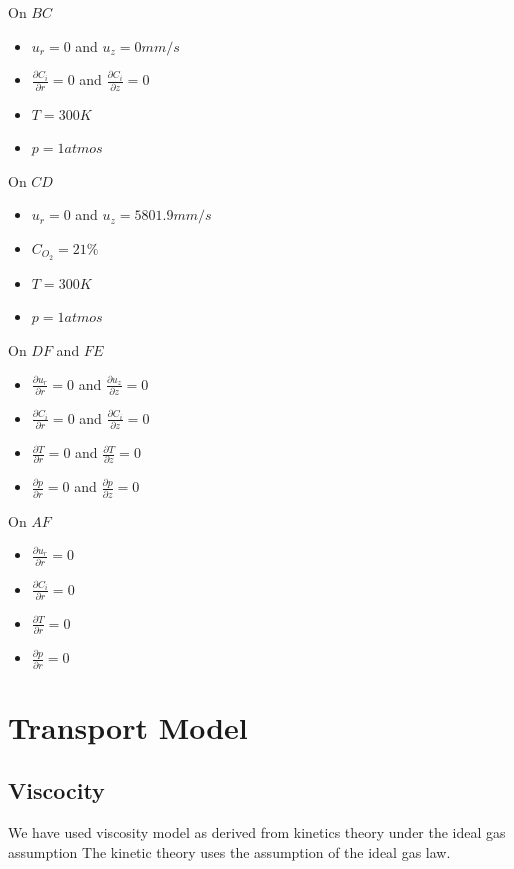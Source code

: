 \bigskip 
\noindent On $BC$
\begin{itemize}
\item $u_r = 0$ and $u_z=0 mm/s$
\item $\frac{\partial C_i}{\partial r} =0 $ and $\frac{\partial C_i}{\partial z} =0 $
\item $T = 300K$
\item $p=1 atmos$
\end{itemize}

\noindent On $CD$
\begin{itemize}
\item $u_r = 0$ and $u_z=5801.9 mm/s$
\item $ C_{O_2} =21 \% $
\item $T = 300K$
\item $p=1 atmos$
\end{itemize}

\noindent On $DF$ and $FE$
\begin{itemize}
\item $\frac{\partial u_r}{\partial r} =0 $ and $\frac{\partial u_z}{\partial z} =0 $
\item $\frac{\partial C_i}{\partial r} =0 $ and $\frac{\partial C_i}{\partial z} =0 $
\item $\frac{\partial T}{\partial r} =0 $ and $\frac{\partial T}{\partial z} =0 $
\item $\frac{\partial p}{\partial r} =0 $ and $\frac{\partial p}{\partial z} =0 $
\end{itemize}


\noindent On $AF$
\begin{itemize}
\item $\frac{\partial u_r}{\partial r} =0 $ 
\item $\frac{\partial C_i}{\partial r} =0 $ 
\item $\frac{\partial T}{\partial r} =0 $  
\item $\frac{\partial p}{\partial r} =0 $
\end{itemize}

\section{Transport Model}
\subsection{Viscocity}
\noindent We have used viscosity model as derived from kinetics theory under the ideal gas assumption
The kinetic theory uses the assumption of the ideal gas law.
 
